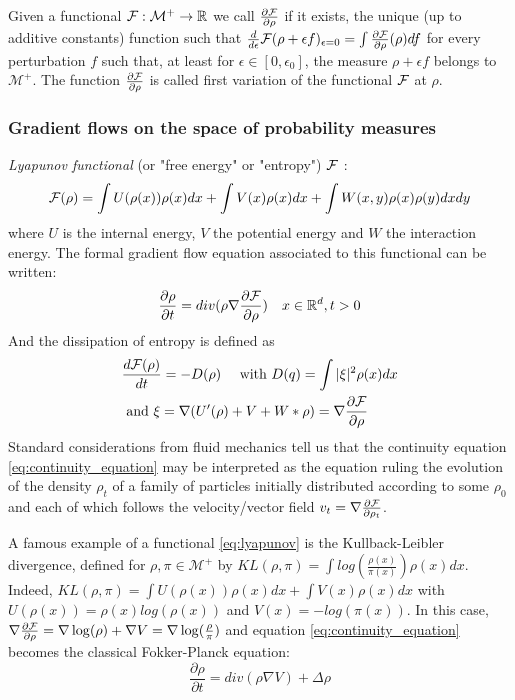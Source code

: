 Given a functional ${{\mathcal F}} : \mathcal{M}^+ \rightarrow {{\mathbb R}}$ we call $\frac{\partial{{{\mathcal F}}}}{\partial{\rho}}$ if it exists, the unique (up to additive constants) function such that $\frac{d}{d\epsilon}{{\mathcal F}}(\rho+\epsilon  f)_{\epsilon=0}=\int\frac{\partial{{{\mathcal F}}}}{\partial{\rho}}(\rho) df$ for every perturbation $f$ such that, at least for $\epsilon \in [0, \epsilon_0]$, the measure $\rho +\epsilon f$ belongs to $\mathcal{M}^+$. The function $\frac{\partial{{{\mathcal F}}}}{\partial{\rho}}$ is called first variation of the functional ${{\mathcal F}}$ at $\rho$.

\subsubsection{Gradient flows on the space of probability measures}

\textit{Lyapunov functional} (or "free energy" or "entropy") ${{\mathcal F}}$  \citep{villani2004trend}:
\begin{equation}\label{eq:lyapunov}
{{\mathcal F}}(\rho)=\int U(\rho(x)) \rho(x)dx + \int V(x)\rho(x)dx + \int W(x,y)\rho(x)\rho(y)dxdy
\end{equation}
where  $U$ is the internal energy, $V$ the potential energy and $W$ the
interaction energy. The formal gradient flow equation associated to this functional can be written:
\begin{equation}\label{eq:continuity_equation}
\frac{\partial \rho}{\partial t}= div( \rho \nabla \frac{\partial {{\mathcal F}}}{\partial \rho}) \quad x \in {{\mathbb R}}^d , t>0
\end{equation}
And the dissipation of entropy is defined as %
\begin{align}
&        \frac{d {{\mathcal F}}(\rho)}{dt} =-D(\rho) \quad \text{ with } D(q)= \int |\xi|^2 \rho(x)dx\\
&\text{ and } \xi= \nabla (U'(\rho) + V + W * \rho)= \nabla \frac{\partial {{\mathcal F}}}{\partial \rho}
\end{align}
Standard considerations from fluid mechanics tell us that the continuity equation \eqref{eq:continuity_equation} may be interpreted as the equation ruling the evolution of the density $\rho_t$ of a family of particles initially distributed according to some $\rho_0$ and each of which follows the velocity/vector field $v_t=\nabla \frac{\partial{{{\mathcal F}}}}{\partial{\rho_t}}$.

\begin{remark} 
	A famous example of a functional \eqref{eq:lyapunov} is the Kullback-Leibler divergence, defined for $\rho, \pi \in \mathcal{M}^+$ by
	$KL(\rho,\pi)=\int log(\frac{\rho(x)}{\pi(x)})\rho(x)dx$. Indeed, $KL(\rho, \pi)=\int U(\rho(x))\rho(x)dx + \int V(x) \rho(x)dx$ with $U(\rho(x))=\rho(x)log(\rho(x))$ and $V(x)=-log(\pi(x))$. In this case, $\nabla \frac{\partial {{\mathcal F}}}{\partial \rho}= \nabla \log(\rho) + \nabla V=  \nabla \log(\frac{\rho}{\pi})$ and equation \eqref{eq:continuity_equation} becomes the classical Fokker-Planck equation:
	\begin{equation}\label{eq:Fokker-Planck}
	\frac{\partial{\rho}}{\partial t}= div(\rho \nabla V )+ \Delta \rho
	\end{equation}
\end{remark}

